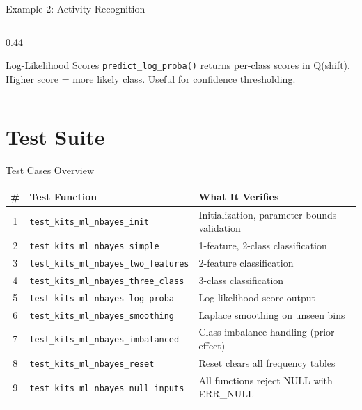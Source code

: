\documentclass[aspectratio=169, 10pt]{beamer}
\begin{document}
\begin{frame}[fragile]{Example 2: Activity Recognition}
\begin{columns}[T]
\begin{column}{0.44\textwidth}
\begin{center}
\end{center}

\vspace{0.5em}
\begin{block}{Log-Likelihood Scores}
\texttt{predict\_log\_proba()} returns
per-class scores in Q(shift).
Higher score = more likely class.
Useful for confidence thresholding.
\end{block}
\end{column}
\end{columns}
\end{frame}

\section{Test Suite}

\begin{frame}{Test Cases Overview}
\begin{table}
\centering
\small
\begin{tabular}{@{}clp{7cm}@{}}
\toprule
\textbf{\#} & \textbf{Test Function} & \textbf{What It Verifies} \\
\midrule
1 & \texttt{test\_kits\_ml\_nbayes\_init}
  & Initialization, parameter bounds validation \\
2 & \texttt{test\_kits\_ml\_nbayes\_simple}
  & 1-feature, 2-class classification \\
3 & \texttt{test\_kits\_ml\_nbayes\_two\_features}
  & 2-feature classification \\
4 & \texttt{test\_kits\_ml\_nbayes\_three\_class}
  & 3-class classification \\
5 & \texttt{test\_kits\_ml\_nbayes\_log\_proba}
  & Log-likelihood score output \\
6 & \texttt{test\_kits\_ml\_nbayes\_smoothing}
  & Laplace smoothing on unseen bins \\
7 & \texttt{test\_kits\_ml\_nbayes\_imbalanced}
  & Class imbalance handling (prior effect) \\
8 & \texttt{test\_kits\_ml\_nbayes\_reset}
  & Reset clears all frequency tables \\
9 & \texttt{test\_kits\_ml\_nbayes\_null\_inputs}
  & All functions reject NULL with ERR\_NULL \\
\bottomrule
\end{tabular}
\end{table}
\end{frame}
\end{document}
